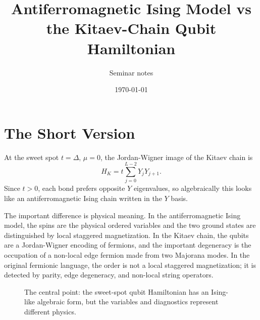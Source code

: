 \documentclass[11pt]{article}
\title{Antiferromagnetic Ising Model vs the Kitaev-Chain Qubit Hamiltonian}
\author{Seminar notes}
\date{\today}
\begin{document}
\maketitle

\section{The Short Version}

At the sweet spot $t=\Delta$, $\mu=0$, the Jordan-Wigner image of the Kitaev
chain is
\begin{equation}
  H_K = t\sum_{j=0}^{L-2}Y_jY_{j+1}.
\end{equation}
Since $t>0$, each bond prefers opposite $Y$ eigenvalues, so algebraically this
looks like an antiferromagnetic Ising chain written in the $Y$ basis.

The important difference is physical meaning. In the antiferromagnetic Ising
model, the spins are the physical ordered variables and the two ground states
are distinguished by local staggered magnetization. In the Kitaev chain, the
qubits are a Jordan-Wigner encoding of fermions, and the important degeneracy
is the occupation of a non-local edge fermion made from two Majorana modes. In
the original fermionic language, the order is not a local staggered
magnetization; it is detected by parity, edge degeneracy, and non-local string
operators.

\begin{figure}[h]
\centering
{}
\caption{The central point: the sweet-spot qubit Hamiltonian has an Ising-like
algebraic form, but the variables and diagnostics represent different physics.}
\label{fig:concept-map}
\end{figure}
\end{document}
